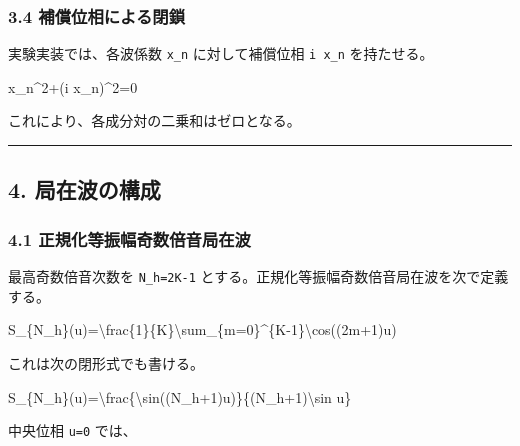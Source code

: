 \documentclass[
  a4paper,
]{article}
\newenvironment{Shaded}{}{}
\newcommand{\NormalTok}[1]{#1}
\begin{document}
\subsubsection{3.4
補償位相による閉鎖}\label{ux88dcux511fux4f4dux76f8ux306bux3088ux308bux9589ux9396}

実験実装では、各波係数 \texttt{x\_n} に対して補償位相 \texttt{i\ x\_n}
を持たせる。

\begin{Shaded}
\begin{Highlighting}[]
\NormalTok{x\_n\^{}2+(i x\_n)\^{}2=0}
\end{Highlighting}
\end{Shaded}

これにより、各成分対の二乗和はゼロとなる。

\begin{center}\rule{0.5\linewidth}{0.5pt}\end{center}

\subsection{4. 局在波の構成}\label{ux5c40ux5728ux6ce2ux306eux69cbux6210}

\subsubsection{4.1
正規化等振幅奇数倍音局在波}\label{ux6b63ux898fux5316ux7b49ux632fux5e45ux5947ux6570ux500dux97f3ux5c40ux5728ux6ce2}

最高奇数倍音次数を \texttt{N\_h=2K-1}
とする。正規化等振幅奇数倍音局在波を次で定義する。

\begin{Shaded}
\begin{Highlighting}[]
\NormalTok{S\_\{N\_h\}(u)=\textbackslash{}frac\{1\}\{K\}\textbackslash{}sum\_\{m=0\}\^{}\{K{-}1\}\textbackslash{}cos((2m+1)u)}
\end{Highlighting}
\end{Shaded}

これは次の閉形式でも書ける。

\begin{Shaded}
\begin{Highlighting}[]
\NormalTok{S\_\{N\_h\}(u)=\textbackslash{}frac\{\textbackslash{}sin((N\_h+1)u)\}\{(N\_h+1)\textbackslash{}sin u\}}
\end{Highlighting}
\end{Shaded}

中央位相 \texttt{u=0} では、
\end{document}
